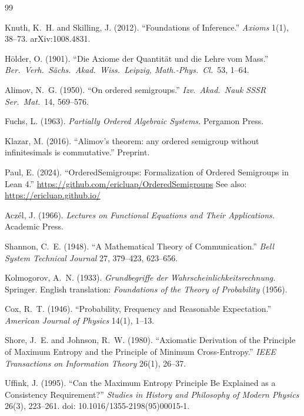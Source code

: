 \documentclass[11pt]{article}
\theoremstyle{definition}
\theoremstyle{remark}
\begin{document}
\begin{thebibliography}{99}

Knuth, K.~H. and Skilling, J. (2012).
``Foundations of Inference.''
\emph{Axioms} 1(1), 38--73.
arXiv:1008.4831.

H\"older, O. (1901).
``Die Axiome der Quantit\"at und die Lehre vom Mass.''
\emph{Ber.\ Verh.\ S\"achs.\ Akad.\ Wiss.\ Leipzig, Math.-Phys.\ Cl.}\ 53, 1--64.

Alimov, N.~G. (1950).
``On ordered semigroups.''
\emph{Izv.\ Akad.\ Nauk SSSR Ser.\ Mat.}\ 14, 569--576.

Fuchs, L. (1963).
\emph{Partially Ordered Algebraic Systems.}
Pergamon Press.

Klazar, M. (2016).
``Alimov's theorem: any ordered semigroup without infinitesimals is commutative.''
Preprint.

Paul, E. (2024).
``OrderedSemigroups: Formalization of Ordered Semigroups in Lean 4.''
\url{https://github.com/ericluap/OrderedSemigroups}
See also: \url{https://ericluap.github.io/}

Acz\'el, J. (1966).
\emph{Lectures on Functional Equations and Their Applications.}
Academic Press.

Shannon, C.~E. (1948).
``A Mathematical Theory of Communication.''
\emph{Bell System Technical Journal} 27, 379--423, 623--656.

Kolmogorov, A.~N. (1933).
\emph{Grundbegriffe der Wahrscheinlichkeitsrechnung.}
Springer.
English translation: \emph{Foundations of the Theory of Probability} (1956).

Cox, R.~T. (1946).
``Probability, Frequency and Reasonable Expectation.''
\emph{American Journal of Physics} 14(1), 1--13.

Shore, J.~E. and Johnson, R.~W. (1980).
``Axiomatic Derivation of the Principle of Maximum Entropy and the Principle of Minimum Cross-Entropy.''
\emph{IEEE Transactions on Information Theory} 26(1), 26--37.

Uffink, J. (1995).
``Can the Maximum Entropy Principle Be Explained as a Consistency Requirement?''
\emph{Studies in History and Philosophy of Modern Physics} 26(3), 223--261.
doi: 10.1016/1355-2198(95)00015-1.


\end{thebibliography}
\end{document}
